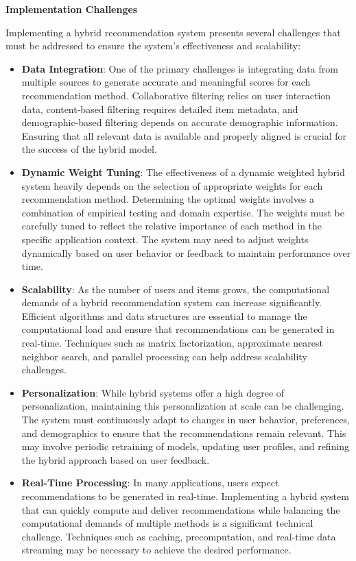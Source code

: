 \documentclass{article}
\begin{document}
\textbf{Implementation Challenges}

Implementing a hybrid recommendation system presents several challenges that must be addressed to ensure the system's effectiveness and scalability:

\begin{itemize}
    \item \textbf{Data Integration}: One of the primary challenges is integrating data from multiple sources to generate accurate and meaningful scores for each recommendation method. Collaborative filtering relies on user interaction data, content-based filtering requires detailed item metadata, and demographic-based filtering depends on accurate demographic information. Ensuring that all relevant data is available and properly aligned is crucial for the success of the hybrid model.
    \item \textbf{Dynamic Weight Tuning}: The effectiveness of a dynamic weighted hybrid system heavily depends on the selection of appropriate weights for each recommendation method. Determining the optimal weights involves a combination of empirical testing and domain expertise. The weights must be carefully tuned to reflect the relative importance of each method in the specific application context. The system may need to adjust weights dynamically based on user behavior or feedback to maintain performance over time.
    \item \textbf{Scalability}: As the number of users and items grows, the computational demands of a hybrid recommendation system can increase significantly. Efficient algorithms and data structures are essential to manage the computational load and ensure that recommendations can be generated in real-time. Techniques such as matrix factorization, approximate nearest neighbor search, and parallel processing can help address scalability challenges.
    \item \textbf{Personalization}: While hybrid systems offer a high degree of personalization, maintaining this personalization at scale can be challenging. The system must continuously adapt to changes in user behavior, preferences, and demographics to ensure that the recommendations remain relevant. This may involve periodic retraining of models, updating user profiles, and refining the hybrid approach based on user feedback.
    \item \textbf{Real-Time Processing}: In many applications, users expect recommendations to be generated in real-time. Implementing a hybrid system that can quickly compute and deliver recommendations while balancing the computational demands of multiple methods is a significant technical challenge. Techniques such as caching, precomputation, and real-time data streaming may be necessary to achieve the desired performance.
\end{itemize}
\end{document}
